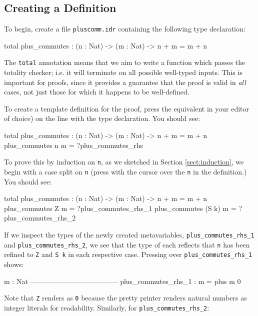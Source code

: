 \subsection{Creating a Definition}

To begin, create a file \texttt{pluscomm.idr}
containing the following type declaration:

\begin{code}
total
plus_commutes : (n : Nat) -> (m : Nat) -> n + m = m + n
\end{code}

\noindent
The \texttt{total} annotation means that we aim to write a function which
passes the totality checker; i.e. it will terminate on all possible
well-typed inputs. This is important for proofs, since it provides a 
guarantee that the proof is valid in \emph{all} cases, not just those for
which it happens to be well-defined.

To create a template definition for the proof, press \mkdef{}
the equivalent in your editor of choice) on the line with the type
declaration. You should see:

\begin{code}
total
plus_commutes : (n : Nat) -> (m : Nat) -> n + m = m + n
plus_commutes n m = ?plus_commutes_rhs
\end{code}

\noindent
To prove this by induction on \texttt{n}, as we sketched in Section
\ref{sect:induction}, we begin with a case split on \texttt{n} (press
\csplit{}
with the cursor over the \texttt{n} in the definition.) You
should see:

\begin{code}
total
plus_commutes : (n : Nat) -> (m : Nat) -> n + m = m + n
plus_commutes Z m = ?plus_commutes_rhs_1
plus_commutes (S k) m = ?plus_commutes_rhs_2
\end{code}

\noindent
If we inspect the types of the newly created metavariables, 
\texttt{plus\_commutes\_rhs\_1}
and 
\texttt{plus\_commutes\_rhs\_2}, we see that the type of each reflects that
\texttt{n} has been refined to \texttt{Z} and \texttt{S k} in each respective
case. Pressing \ctype{} over \texttt{plus\_commutes\_rhs\_1} shows:

\begin{code}
  m : Nat
--------------------------------------
plus_commutes_rhs_1 : m = plus m 0
\end{code}

\noindent
Note that \texttt{Z} renders as \texttt{0} because the pretty printer renders
natural numbers as integer literals for readability.
Similarly, for \texttt{plus\_commutes\_rhs\_2}:

